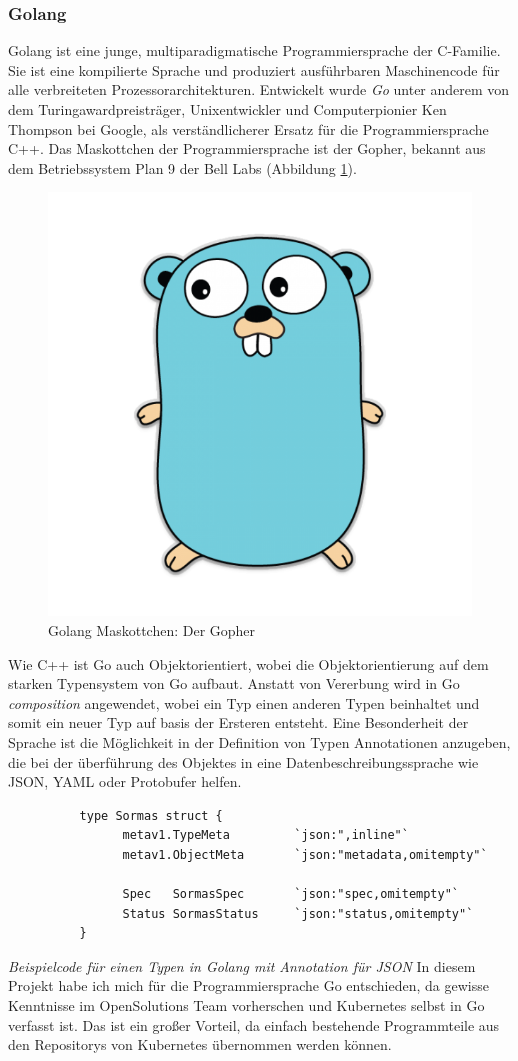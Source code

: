 \documentclass[a4paper,11pt]{article}
\begin{document}
      \subsubsection{Golang}
      Golang ist eine junge, multiparadigmatische Programmiersprache der C-Familie. Sie ist eine kompilierte Sprache und produziert ausführbaren
      Maschinencode für alle verbreiteten Prozessorarchitekturen. Entwickelt wurde \emph{Go} unter anderem von dem Turingawardpreisträger, Unixentwickler und 
      Computerpionier Ken Thompson bei Google, als verständlicherer Ersatz für die Programmiersprache C++. Das Maskottchen der Programmiersprache ist der Gopher,
      bekannt aus dem Betriebssystem Plan 9 der Bell Labs (Abbildung \ref{fig:gopher}).
      \begin{figure}[!ht]
        \includegraphics[width=0.3\linewidth]{assets/gopher.png}
        \caption{Golang Maskottchen: Der Gopher}
        \label{fig:gopher}
      \end{figure}
      Wie C++ ist Go auch Objektorientiert, wobei die Objektorientierung
      auf dem starken Typensystem von Go aufbaut. Anstatt von Vererbung wird in Go \emph{composition} angewendet, wobei ein Typ einen anderen Typen beinhaltet und somit ein 
      neuer Typ auf basis der Ersteren entsteht. Eine Besonderheit der Sprache ist die Möglichkeit in der Definition von Typen Annotationen anzugeben, die bei der
      überführung des Objektes in eine Datenbeschreibungssprache wie JSON, YAML oder Protobufer helfen.
      \begin{lstlisting}
          type Sormas struct {
            	metav1.TypeMeta         `json:",inline"`
            	metav1.ObjectMeta       `json:"metadata,omitempty"`

              	Spec   SormasSpec       `json:"spec,omitempty"`
              	Status SormasStatus     `json:"status,omitempty"`
          }
      \end{lstlisting}
      \emph{Beispielcode für einen Typen in Golang mit Annotation für JSON}\newline
      In diesem Projekt habe ich mich für die Programmiersprache Go entschieden, da gewisse Kenntnisse im OpenSolutions Team vorherschen und Kubernetes selbst in Go verfasst ist.
      Das ist ein großer Vorteil, da einfach bestehende Programmteile aus den Repositorys von Kubernetes übernommen werden können.
\end{document}

